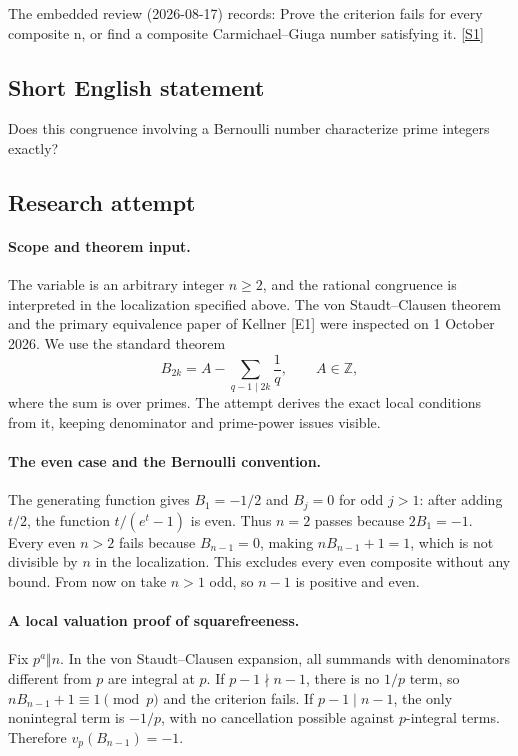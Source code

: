 \documentclass[11pt,a4paper]{article}
\newcommand{\sref}[2]{\hyperlink{source:#1:#2}{[S#2]}}
\begin{document}
The embedded review (2026-08-17) records: Prove the criterion fails for every composite n, or find a composite Carmichael--Giuga number satisfying it. \sref{statement}{1}

\subsection{Short English statement}

Does this congruence involving a Bernoulli number characterize prime integers exactly?

\subsection{Research attempt}

\paragraph{Scope and theorem input.}
The variable is an arbitrary integer $n\ge2$, and the rational
congruence is interpreted in the localization specified above. The
von Staudt--Clausen theorem and the primary equivalence paper of Kellner
[E1] were inspected on 1 October 2026. We use the standard theorem
\[
 B_{2k}=A-\sum_{q-1\mid2k}\frac1q,\qquad A\in\mathbb Z,
\]
where the sum is over primes. The attempt derives the exact local
conditions from it, keeping denominator and prime-power issues visible.

\paragraph{The even case and the Bernoulli convention.}
The generating function gives $B_1=-1/2$ and $B_j=0$ for odd
$j>1$: after adding $t/2$, the function $t/(e^t-1)$ is even.
Thus $n=2$ passes because $2B_1=-1$. Every even $n>2$ fails because
$B_{n-1}=0$, making $nB_{n-1}+1=1$, which is not divisible by $n$
in the localization. This excludes every even composite without any
bound. From now on take $n>1$ odd, so $n-1$ is positive and even.

\paragraph{A local valuation proof of squarefreeness.}
Fix $p^a\Vert n$. In the von Staudt--Clausen expansion, all summands
with denominators different from $p$ are integral at $p$. If
$p-1\nmid n-1$, there is no $1/p$ term, so $nB_{n-1}+1\equiv1\pmod p$
and the criterion fails. If $p-1\mid n-1$, the only nonintegral
term is $-1/p$, with no cancellation possible against $p$-integral
terms. Therefore $v_p(B_{n-1})=-1$.
\end{document}

